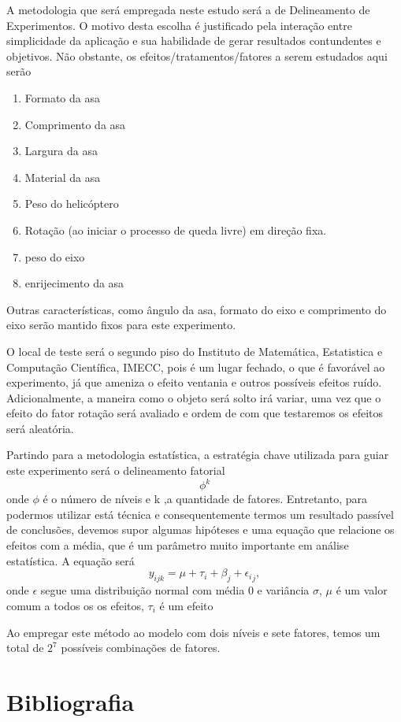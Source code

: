 \documentclass[10pt]{article}
\begin{document}
A metodologia que será empregada neste estudo será a de Delineamento de Experimentos.  O motivo desta escolha é justificado pela interação entre simplicidade da aplicação e sua habilidade de gerar  resultados contundentes e objetivos. Não obstante, os efeitos/tratamentos/fatores a serem estudados aqui serão

\begin{enumerate}
\item Formato da asa
\item  Comprimento da asa
\item Largura da asa
\item Material da asa
\item Peso do helicóptero
\item Rotação (ao iniciar o processo de queda livre) em direção fixa.
\item peso do eixo
\item enrijecimento da asa
\end{enumerate}

Outras características, como ângulo da asa, formato do eixo e comprimento do eixo serão mantido fixos para este experimento.

O local de teste será o segundo piso do Instituto de Matemática, Estatistica e Computação Científica, IMECC, pois é um lugar fechado, o que é favorável ao experimento, já que ameniza o efeito ventania e outros possíveis efeitos ruído. Adicionalmente, a maneira como o objeto será solto irá variar, uma vez que o efeito do fator rotação será avaliado e ordem de com que testaremos os efeitos será aleatória.

Partindo para a metodologia estatística, a estratégia chave utilizada para guiar este experimento será o delineamento fatorial $$\phi^k$$ onde $\phi$ é o número de níveis e k ,a quantidade de fatores. Entretanto, para podermos utilizar está técnica e consequentemente termos um resultado passível de conclusões, devemos supor algumas hipóteses e uma equação que relacione os efeitos com a média, que é um parâmetro muito importante em análise estatística. A equação será $$y_{ijk}= \mu + \tau_i + \beta_j + {\epsilon_i}_j,$$  onde  $\epsilon$ segue uma distribuição normal com média 0 e variância $\sigma$, $\mu$ é um valor comum a todos os os efeitos, $\tau_i$ é um efeito

Ao empregar este método ao modelo com dois níveis e sete fatores, temos um total de $2^{7}$ possíveis combinações de fatores.


\section{Bibliografia}
\end{document}
